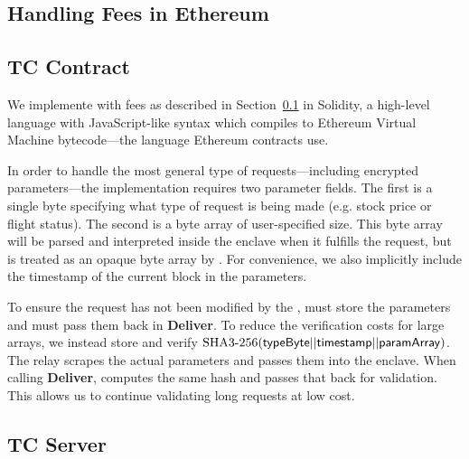 \subsection{Handling Fees in Ethereum}
\label{sec:gas-protocol}





\subsection{TC Contract}

We implemente \tcont with fees as described in Section~\ref{sec:gas-protocol} in Solidity,
a high-level language with JavaScript-like syntax which compiles to Ethereum Virtual Machine bytecode---the language Ethereum contracts use.

In order to handle the most general type of requests---including encrypted parameters---the \tcont implementation requires two parameter fields.
The first is a single byte specifying what type of request is being made (e.g. stock price or flight status).
The second is a byte array of user-specified size.
This byte array will be parsed and interpreted inside the enclave when it fulfills the request, but is treated as an opaque byte array by \tcont.
For convenience, we also implicitly include the timestamp of the current block in the parameters.

To ensure the request has not been modified by the \medname, \tcont must store the parameters and \tc must pass them back in {\bf Deliver}.
To reduce the verification costs for large arrays, we instead store and verify $\text{SHA3-256}({\sf typeByte} || {\sf timestamp} || {\sf paramArray})$.
The relay scrapes the actual parameters and passes them into the enclave.
When calling {\bf Deliver}, \enclaveprog computes the same hash and passes that back for validation.
This allows us to continue validating long requests at low cost.



\subsection{TC Server}


